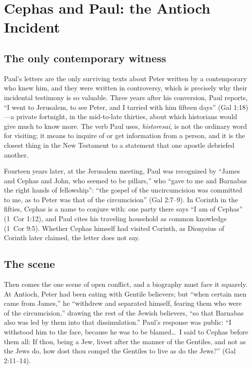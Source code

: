 \section{Cephas and Paul: the Antioch Incident}

\subsection{The only contemporary witness}

Paul's letters are the only surviving texts about Peter written by a
contemporary who knew him, and they were written in controversy, which is
precisely why their incidental testimony is so valuable. Three years after
his conversion, Paul reports, ``I went to Jerusalem, to see Peter, and I
tarried with him fifteen days'' (Gal 1:18)---a private fortnight, in the
mid-to-late thirties, about which historians would give much to know more.
The verb Paul uses, \textit{historesai}, is not the ordinary word for
visiting; it means to inquire of or get information from a person, and it is
the closest thing in the New Testament to a statement that one apostle
debriefed another.

Fourteen years later, at the Jerusalem meeting, Paul was recognized by
``James and Cephas and John, who seemed to be pillars,'' who ``gave to me
and Barnabas the right hands of fellowship'': ``the gospel of the
uncircumcision was committed to me, as to Peter was that of the
circumcision'' (Gal 2:7--9). In Corinth in the fifties, Cephas is a name to
conjure with: one party there says ``I am of Cephas'' (1~Cor 1:12), and
Paul cites his traveling household as common knowledge (1~Cor 9:5). Whether
Cephas himself had visited Corinth, as Dionysius of Corinth later claimed,
the letter does not say.

\subsection{The scene}

Then comes the one scene of open conflict, and a biography must face it
squarely. At Antioch, Peter had been eating with Gentile believers; but
``when certain men came from James,'' he ``withdrew and separated himself,
fearing them who were of the circumcision,'' drawing the rest of the Jewish
believers, ``so that Barnabas also was led by them into that
dissimulation.'' Paul's response was public: ``I withstood him to the face,
because he was to be blamed\ldots\ I said to Cephas before them all: If
thou, being a Jew, livest after the manner of the Gentiles, and not as the
Jews do, how dost thou compel the Gentiles to live as do the Jews?''
(Gal 2:11--14).

